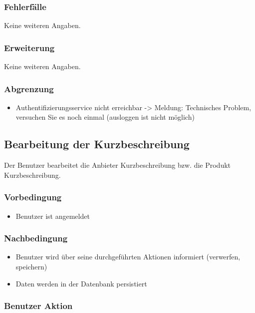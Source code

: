 \documentclass[a4paper,12pt]{article}
\begin{document}
\subsubsection{Fehlerfälle}\label{fehlerfalle-1}
Keine weiteren Angaben.

\subsubsection{Erweiterung}\label{erweiterung}
Keine weiteren Angaben.

\subsubsection{Abgrenzung}\label{abgrenzung}

\begin{itemize}
\item
  Authentifizierungsservice nicht erreichbar -\textgreater{} Meldung:
  Technisches Problem, versuchen Sie es noch einmal (ausloggen ist nicht
  möglich)
\end{itemize}

\clearpage

\subsection{Bearbeitung der Kurzbeschreibung}
Der Benutzer bearbeitet die Anbieter Kurzbeschreibung bzw. die Produkt Kurzbeschreibung.
\subsubsection{Vorbedingung}

\begin{itemize}
\item
  Benutzer ist angemeldet
\end{itemize}

\subsubsection{Nachbedingung}\label{nachbedingung-2}

\begin{itemize}
\item
  Benutzer wird über seine durchgeführten Aktionen informiert
  (verwerfen, speichern)
\item
  Daten werden in der Datenbank persistiert
\end{itemize}

\subsubsection{Benutzer Aktion}\label{benutzer-aktion-2}
\end{document}
